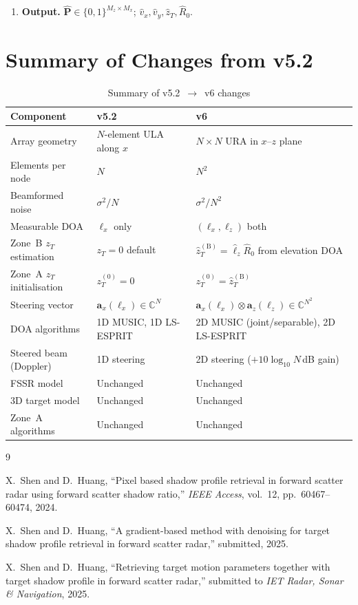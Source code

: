 \documentclass[11pt,a4paper]{article}
\newcommand{\C}{\mathbb{C}}
\begin{document}
\begin{enumerate}
  \item \textbf{Output.}
    $\hat{\mathbf{P}}\in\{0,1\}^{M_z\times M_x}$;\;
    $\hat{v}_x,\hat{v}_y,\hat{z}_T,\hat{R}_0$.
\end{enumerate}

\section{Summary of Changes from v5.2}
\label{sec:changes}

\begin{table}[H]
\centering
\caption{Summary of v5.2~$\to$~v6 changes}
\label{tab:changes}
\begin{tabular}{@{}p{3.5cm}p{5cm}p{5cm}@{}}
\toprule
\textbf{Component} & \textbf{v5.2} & \textbf{v6} \\
\midrule
Array geometry & $N$-element ULA along $x$ &
  $N\times N$ URA in $x$--$z$ plane \\
Elements per node & $N$ & $N^2$ \\
Beamformed noise & $\sigma^2/N$ & $\sigma^2/N^2$ \\
Measurable DOA & $\ell_x$ only &
  $(\ell_x,\ell_z)$ both \\
Zone~B $z_T$ estimation & $z_T=0$ default &
  $\hat{z}_T^{(\mathrm{B})}=\hat{\ell}_z\hat{R}_0$ from
  elevation DOA \\
Zone~A $z_T$ initialisation &
  $z_T^{(0)}=0$ &
  $z_T^{(0)}=\hat{z}_T^{(\mathrm{B})}$ \\
Steering vector & $\mathbf{a}_x(\ell_x)\in\C^N$ &
  $\mathbf{a}_x(\ell_x)\otimes\mathbf{a}_z(\ell_z)\in\C^{N^2}$ \\
DOA algorithms & 1D MUSIC, 1D LS-ESPRIT &
  2D MUSIC (joint/separable), 2D LS-ESPRIT \\
Steered beam (Doppler) & 1D steering &
  2D steering ($+10\log_{10}N$\,dB gain) \\
FSSR model & Unchanged & Unchanged \\
3D target model & Unchanged & Unchanged \\
Zone~A algorithms & Unchanged & Unchanged \\
\bottomrule
\end{tabular}
\end{table}

\begin{thebibliography}{9}

X.~Shen and D.~Huang,
``Pixel based shadow profile retrieval in forward scatter radar using
forward scatter shadow ratio,''
\emph{IEEE Access}, vol.~12, pp.~60467--60474, 2024.

X.~Shen and D.~Huang,
``A gradient-based method with denoising for target shadow profile
retrieval in forward scatter radar,''
submitted, 2025.

X.~Shen and D.~Huang,
``Retrieving target motion parameters together with target shadow
profile in forward scatter radar,''
submitted to \emph{IET Radar, Sonar \& Navigation}, 2025.

\end{thebibliography}
\end{document}
